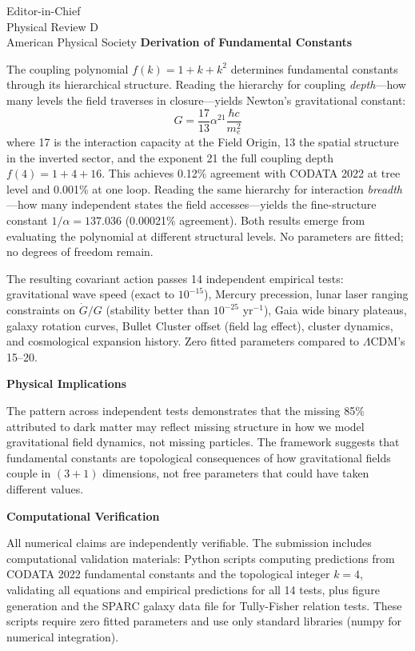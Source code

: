 \documentclass[11pt]{letter}
\begin{document}
\begin{letter}{%
Editor-in-Chief\\
Physical Review D\\
American Physical Society
}
\textbf{Derivation of Fundamental Constants}

The coupling polynomial $f(k) = 1 + k + k^2$ determines fundamental constants through its hierarchical structure. Reading the hierarchy for coupling \emph{depth}—how many levels the field traverses in closure—yields Newton's gravitational constant:
\begin{equation*}
G = \frac{17}{13}\alpha^{21} \frac{\hbar c}{m_e^2}
\end{equation*}
where 17 is the interaction capacity at the Field Origin, 13 the spatial structure in the inverted sector, and the exponent 21 the full coupling depth $f(4) = 1 + 4 + 16$. This achieves 0.12\% agreement with CODATA 2022 at tree level and 0.001\% at one loop. Reading the same hierarchy for interaction \emph{breadth}—how many independent states the field accesses—yields the fine-structure constant $1/\alpha = 137.036$ (0.00021\% agreement). Both results emerge from evaluating the polynomial at different structural levels. No parameters are fitted; no degrees of freedom remain.

The resulting covariant action passes 14 independent empirical tests: gravitational wave speed (exact to $10^{-15}$), Mercury precession, lunar laser ranging constraints on $\dot{G}/G$ (stability better than $10^{-25}$ yr$^{-1}$), Gaia wide binary plateaus, galaxy rotation curves, Bullet Cluster offset (field lag effect), cluster dynamics, and cosmological expansion history. Zero fitted parameters compared to $\Lambda$CDM's 15--20.

\textbf{Physical Implications}

The pattern across independent tests demonstrates that the missing 85\% attributed to dark matter may reflect missing structure in how we model gravitational field dynamics, not missing particles. The framework suggests that fundamental constants are topological consequences of how gravitational fields couple in $(3+1)$ dimensions, not free parameters that could have taken different values.

\textbf{Computational Verification}

All numerical claims are independently verifiable. The submission includes computational validation materials: Python scripts computing predictions from CODATA 2022 fundamental constants and the topological integer $k = 4$, validating all equations and empirical predictions for all 14 tests, plus figure generation and the SPARC galaxy data file for Tully-Fisher relation tests. These scripts require zero fitted parameters and use only standard libraries (numpy for numerical integration).


\end{letter}
\end{document}
